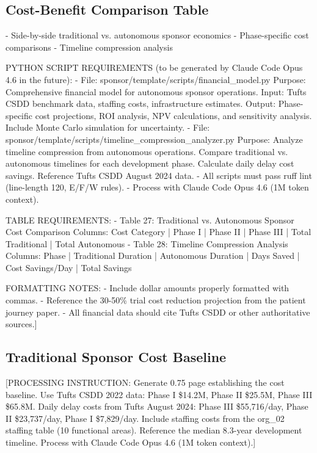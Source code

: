 \subsection{Cost-Benefit Comparison Table}
- Side-by-side traditional vs. autonomous sponsor economics
- Phase-specific cost comparisons
- Timeline compression analysis

PYTHON SCRIPT REQUIREMENTS (to be generated by Claude Code Opus 4.6 in the future):
- File: sponsor/template/scripts/financial\_model.py
  Purpose: Comprehensive financial model for autonomous sponsor operations.
  Input: Tufts CSDD benchmark data, staffing costs, infrastructure estimates.
  Output: Phase-specific cost projections, ROI analysis, NPV calculations,
  and sensitivity analysis. Include Monte Carlo simulation for uncertainty.
- File: sponsor/template/scripts/timeline\_compression\_analyzer.py
  Purpose: Analyze timeline compression from autonomous operations. Compare
  traditional vs. autonomous timelines for each development phase. Calculate
  daily delay cost savings. Reference Tufts CSDD August 2024 data.
- All scripts must pass ruff lint (line-length 120, E/F/W rules).
- Process with Claude Code Opus 4.6 (1M token context).

TABLE REQUIREMENTS:
- Table 27: Traditional vs. Autonomous Sponsor Cost Comparison
  Columns: Cost Category | Phase I | Phase II | Phase III | Total Traditional | Total Autonomous
- Table 28: Timeline Compression Analysis
  Columns: Phase | Traditional Duration | Autonomous Duration | Days Saved | Cost Savings/Day | Total Savings

FORMATTING NOTES:
- Include dollar amounts properly formatted with commas.
- Reference the 30-50\% trial cost reduction projection from the patient journey paper.
- All financial data should cite Tufts CSDD or other authoritative sources.]

\subsection{Traditional Sponsor Cost Baseline}

[PROCESSING INSTRUCTION: Generate 0.75 page establishing the cost baseline. Use Tufts CSDD
2022 data: Phase I \$14.2M, Phase II \$25.5M, Phase III \$65.8M. Daily delay costs from
Tufts August 2024: Phase III \$55,716/day, Phase II \$23,737/day, Phase I \$7,829/day.
Include staffing costs from the org\_02 staffing table (10 functional areas). Reference
the median 8.3-year development timeline.
Process with Claude Code Opus 4.6 (1M token context).]

